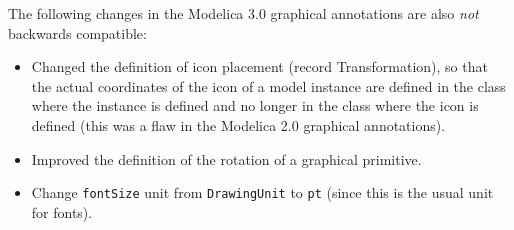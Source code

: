 The following changes in the Modelica 3.0 graphical annotations are also \emph{not} backwards compatible:
\begin{itemize}
\item
  Changed the definition of icon placement (record Transformation), so
  that the actual coordinates of the icon of a model instance are
  defined in the class where the instance is defined and no longer in
  the class where the icon is defined (this was a flaw in the Modelica
  2.0 graphical annotations).
\item
  Improved the definition of the rotation of a graphical primitive.
\item
  Change \lstinline!fontSize! unit from \lstinline!DrawingUnit! to \lstinline!pt! (since this is the usual
  unit for fonts).
\end{itemize}

